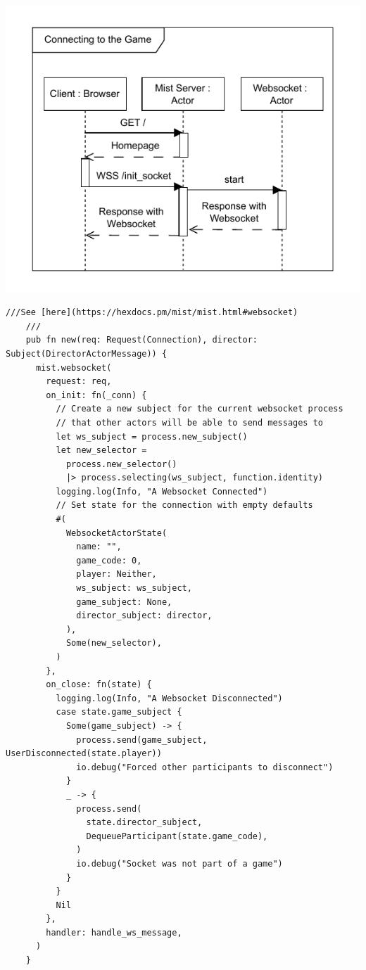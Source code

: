 \documentclass[]{final}
\begin{document}
\begin{minipage}[t]{20em}
  \includegraphics[width=\textwidth]{sequence_connecting}
  \label{fig: 5}
  \vspace*{0.5cm}
  \begin{lstlisting}[language=gleam]
    ///See [here](https://hexdocs.pm/mist/mist.html#websocket)
    ///
    pub fn new(req: Request(Connection), director: Subject(DirectorActorMessage)) {
      mist.websocket(
        request: req,
        on_init: fn(_conn) {
          // Create a new subject for the current websocket process
          // that other actors will be able to send messages to
          let ws_subject = process.new_subject()
          let new_selector =
            process.new_selector()
            |> process.selecting(ws_subject, function.identity)
          logging.log(Info, "A Websocket Connected")
          // Set state for the connection with empty defaults
          #(
            WebsocketActorState(
              name: "",
              game_code: 0,
              player: Neither,
              ws_subject: ws_subject,
              game_subject: None,
              director_subject: director,
            ),
            Some(new_selector),
          )
        },
        on_close: fn(state) {
          logging.log(Info, "A Websocket Disconnected")
          case state.game_subject {
            Some(game_subject) -> {
              process.send(game_subject, UserDisconnected(state.player))
              io.debug("Forced other participants to disconnect")
            }
            _ -> {
              process.send(
                state.director_subject,
                DequeueParticipant(state.game_code),
              )
              io.debug("Socket was not part of a game")
            }
          }
          Nil
        },
        handler: handle_ws_message,
      )
    }
  \end{lstlisting}
\end{minipage}
\end{document}
